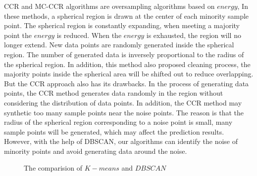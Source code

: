 \documentclass[ida]{iosart2x}
\begin{document}
CCR\cite{2017CCR} and MC-CCR\cite{2020Combined} algorithms are oversampling algorithms based on $energy$,
In these methods, a spherical region is drawn at the center of each minority sample point. 
The spherical region is constantly expanding, when meeting a majority point the $energy$ is reduced.
When the $energy$ is exhausted, the region will no longer extend.
New data points are randomly generated inside the spherical region. 
The number of generated data is inversely proportional to the radius of the spherical region.
In addition, this method also proposed cleaning process, 
the majority points inside the spherical area will be shifted out to reduce overlapping.
But the CCR approach also has its drawbacks. In the process of generating data points,
the CCR method generates data randomly in the region without considering the distribution of data points.
In addition, the CCR method may synthetic too many sample points near the noise points. 
The reason is that the radius of the spherical region corresponding 
to a noise point is small, 
many sample points will be generated, which may affect the prediction results.
However, with the help of DBSCAN, our algorithms can identify the noise of minority points and 
avoid generating data around the noise.
\begin{figure}[tb]
  \centering
  \quad
  \caption{The comparision of $K-means$ and $DBSCAN$}
  \label{fig19}
  \end{figure}
\end{document}

